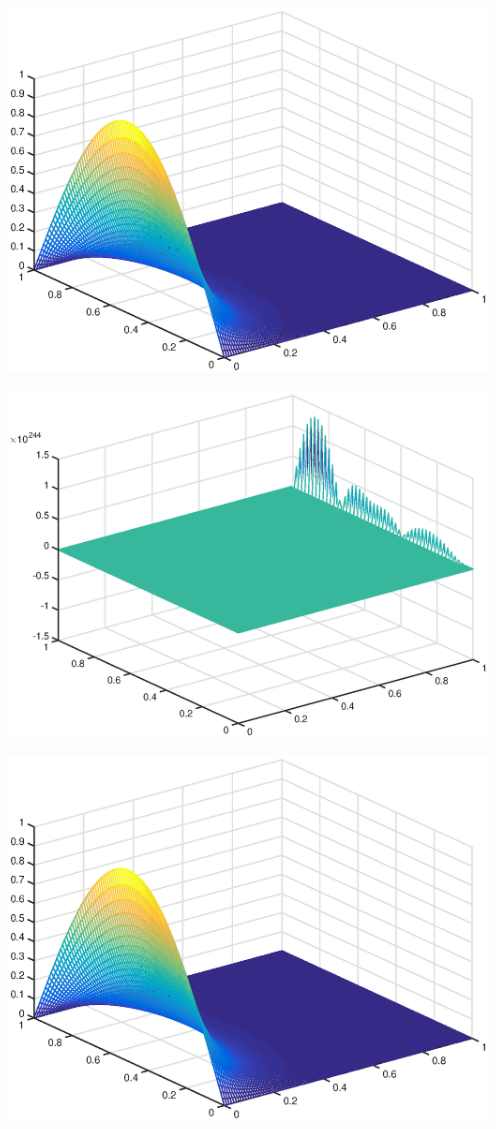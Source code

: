 \documentclass{ctexart}
\begin{document}
\begin{enumerate}
\centerline{\includegraphics[width=5in]{H13_2_1.eps}}

\centerline{\includegraphics[width=5in]{H13_2_2.eps}}

\centerline{\includegraphics[width=5in]{H13_2_3.eps}}


\end{enumerate}
\end{document}
